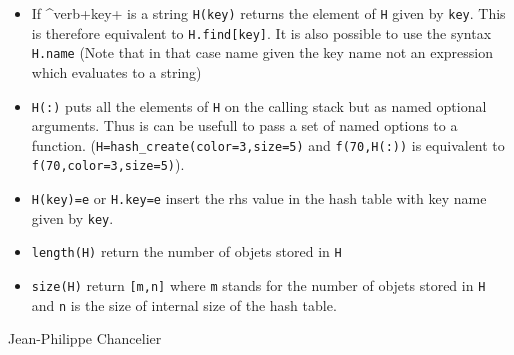 \begin{itemize}
\item If ^verb+key+ is a string \verb+H(key)+ returns the element of \verb+H+ given by \verb+key+. 
  This is therefore equivalent to \verb+H.find[key]+. It is also possible to use 
  the syntax \verb+H.name+ (Note that in that case name given the key name not an expression 
  which evaluates to a string) 
\item \verb+H(:)+ puts all the elements of \verb+H+ on the calling stack but as named 
  optional arguments. Thus is can be usefull to pass a set of named options to a function. 
  (\verb+H=hash_create(color=3,size=5)+ and \verb+f(70,H(:))+ is equivalent to 
  \verb+f(70,color=3,size=5)+).
\item \verb+H(key)=e+ or \verb+H.key=e+ insert the rhs value in the hash table with key name 
  given by \verb+key+.
\end{itemize}

\begin{itemize}
   \item \verb+length(H)+ return the number of objets stored in \verb+H+
   \item \verb+size(H)+ return \verb+[m,n]+ where \verb+m+ stands for the number 
     of objets stored in \verb+H+ and \verb+n+ is the size of internal size of 
     the hash table. 
\end{itemize}

\begin{examples}
  \begin{program}
  \end{program}
 \end{examples}

\begin{authors}
  Jean-Philippe Chancelier
\end{authors}
